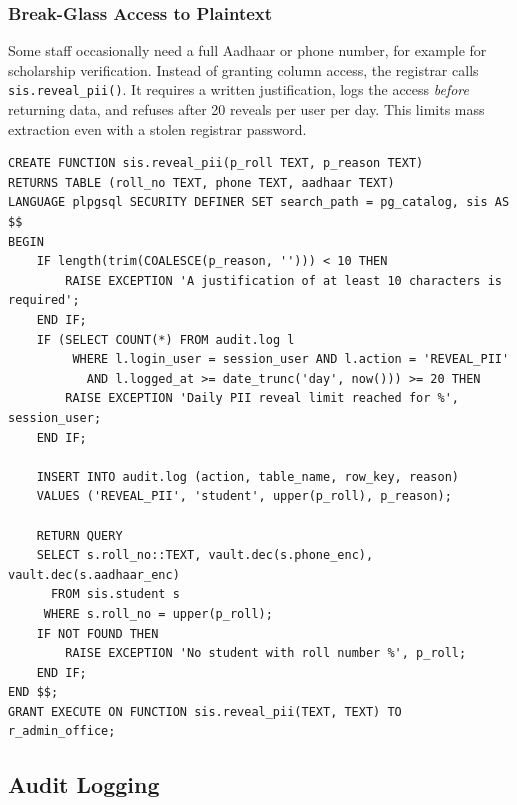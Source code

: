 \documentclass[11pt,a4paper]{report}
\begin{document}
\subsubsection{Break-Glass Access to Plaintext}
Some staff occasionally need a full Aadhaar or phone number, for example for scholarship verification. Instead of granting column access, the registrar calls \texttt{sis.reveal\_pii()}. It requires a written justification, logs the access \emph{before} returning data, and refuses after 20 reveals per user per day. This limits mass extraction even with a stolen registrar password.

\begin{lstlisting}[caption={Audited, rate-limited PII reveal (from \texttt{05\_audit.sql})}]
CREATE FUNCTION sis.reveal_pii(p_roll TEXT, p_reason TEXT)
RETURNS TABLE (roll_no TEXT, phone TEXT, aadhaar TEXT)
LANGUAGE plpgsql SECURITY DEFINER SET search_path = pg_catalog, sis AS $$
BEGIN
    IF length(trim(COALESCE(p_reason, ''))) < 10 THEN
        RAISE EXCEPTION 'A justification of at least 10 characters is required';
    END IF;
    IF (SELECT COUNT(*) FROM audit.log l
         WHERE l.login_user = session_user AND l.action = 'REVEAL_PII'
           AND l.logged_at >= date_trunc('day', now())) >= 20 THEN
        RAISE EXCEPTION 'Daily PII reveal limit reached for %', session_user;
    END IF;

    INSERT INTO audit.log (action, table_name, row_key, reason)
    VALUES ('REVEAL_PII', 'student', upper(p_roll), p_reason);

    RETURN QUERY
    SELECT s.roll_no::TEXT, vault.dec(s.phone_enc), vault.dec(s.aadhaar_enc)
      FROM sis.student s
     WHERE s.roll_no = upper(p_roll);
    IF NOT FOUND THEN
        RAISE EXCEPTION 'No student with roll number %', p_roll;
    END IF;
END $$;
GRANT EXECUTE ON FUNCTION sis.reveal_pii(TEXT, TEXT) TO r_admin_office;
\end{lstlisting}

\subsection{Audit Logging}
\label{sec:audit}
\end{document}
